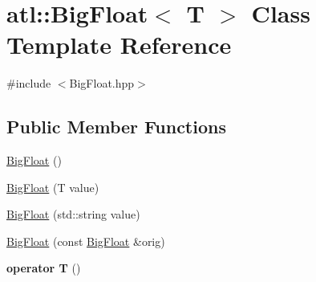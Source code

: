 \hypertarget{classatl_1_1_big_float}{\section{atl\+:\+:Big\+Float$<$ T $>$ Class Template Reference}
\label{classatl_1_1_big_float}
}


{\ttfamily \#include $<$Big\+Float.\+hpp$>$}

\subsection*{Public Member Functions}
\begin{DoxyCompactItemize}
\item 
\hyperlink{classatl_1_1_big_float_adaa49d0d23233b0af3419930f27981d5}{Big\+Float} ()
\item 
\hyperlink{classatl_1_1_big_float_ae2417a2b2c413ebb04a72b161d505552}{Big\+Float} (T value)
\item 
\hyperlink{classatl_1_1_big_float_acc3c443db59988a80edc3d59d4af3ff7}{Big\+Float} (std\+::string value)
\item 
\hyperlink{classatl_1_1_big_float_a7127b61483ca9df2fee2927b9dbcbef5}{Big\+Float} (const \hyperlink{classatl_1_1_big_float}{Big\+Float} \&orig)
\item 
\hypertarget{classatl_1_1_big_float_abac198e9982a461465512320e46482cb}{{\bfseries operator T} ()}\label{classatl_1_1_big_float_abac198e9982a461465512320e46482cb}


\end{DoxyCompactItemize}
